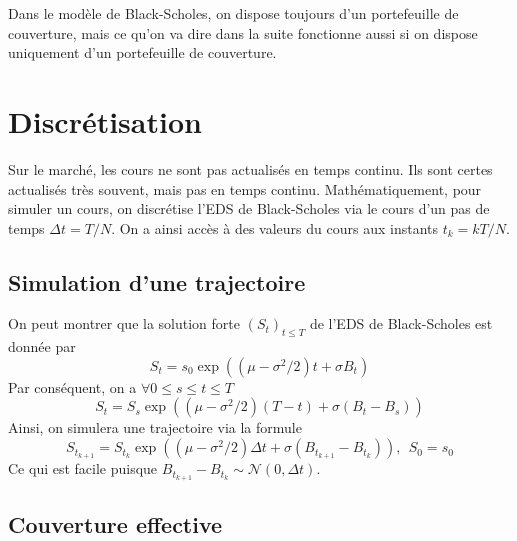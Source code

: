 \documentclass[12pt]{article}
\newcommand{\norm}{\mathcal{N}}
\begin{document}
Dans le modèle de Black-Scholes, on dispose toujours d'un portefeuille de couverture, mais ce qu'on va dire dans la suite fonctionne aussi si on dispose uniquement d'un portefeuille de couverture.

\section{Discrétisation}
Sur le marché, les cours ne sont pas actualisés en temps continu. Ils sont certes actualisés très souvent, mais pas en temps continu. Mathématiquement, pour simuler un cours, on discrétise l'EDS de Black-Scholes via le cours d'un pas de temps $\Delta t = T/N$. On a ainsi accès à des valeurs du cours aux instants $t_k=kT/N$.

\subsection{Simulation d'une trajectoire}
On peut montrer que la solution forte $(S_t)_{t \leq T}$ de l'EDS de Black-Scholes est donnée par
$$S_t = s_0\exp\left((\mu-\sigma^2/2)t+\sigma B_t\right)$$
Par conséquent, on a $\forall 0 \leq s \leq t \leq T$
$$S_t = S_s \exp\left( (\mu-\sigma^2/2)(T-t)+\sigma (B_t -B_s) \right)$$
Ainsi, on simulera une trajectoire via la formule
$$S_{t_{k+1}} = S_{t_k} \exp\left( (\mu-\sigma^2/2)\Delta t+\sigma (B_{t_{k+1}} -B_{t_k}) \right), \ \ S_0=s_0$$
Ce qui est facile puisque $B_{t_{k+1}} -B_{t_k} \sim \norm(0, \Delta t)$.

\subsection{Couverture effective}
\end{document}
